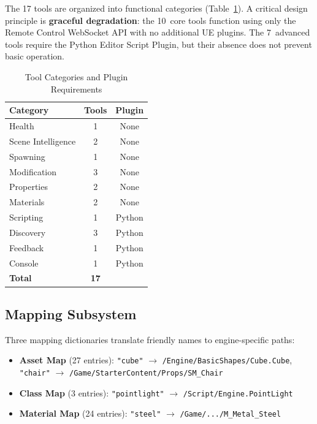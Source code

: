\documentclass[conference]{IEEEtran}
\begin{document}
The 17 tools are organized into functional categories (Table~\ref{tab:tools}). A critical design principle is \textbf{graceful degradation}: the 10~core tools function using only the Remote Control WebSocket API with no additional UE plugins. The 7~advanced tools require the Python Editor Script Plugin, but their absence does not prevent basic operation.

\begin{table}[htbp]
\caption{Tool Categories and Plugin Requirements}
\label{tab:tools}
\centering
\begin{tabular}{lcc}
\toprule
\textbf{Category} & \textbf{Tools} & \textbf{Plugin} \\
\midrule
Health & 1 & None \\
Scene Intelligence & 2 & None \\
Spawning & 1 & None \\
Modification & 3 & None \\
Properties & 2 & None \\
Materials & 2 & None \\
\midrule
Scripting & 1 & Python \\
Discovery & 3 & Python \\
Feedback & 1 & Python \\
Console & 1 & Python \\
\midrule
\textbf{Total} & \textbf{17} & \\
\bottomrule
\end{tabular}
\end{table}

\subsection{Mapping Subsystem}

Three mapping dictionaries translate friendly names to engine-specific paths:

\begin{itemize}[leftmargin=*]
    \item \textbf{Asset Map} (27 entries): \texttt{"cube"} $\rightarrow$ \texttt{/Engine/BasicShapes/Cube.Cube}, \texttt{"chair"} $\rightarrow$ \texttt{/Game/StarterContent/Props/SM\_Chair}
    \item \textbf{Class Map} (3 entries): \texttt{"pointlight"} $\rightarrow$ \texttt{/Script/Engine.PointLight}
    \item \textbf{Material Map} (24 entries): \texttt{"steel"} $\rightarrow$ \texttt{/Game/.../M\_Metal\_Steel}
\end{itemize}
\end{document}
